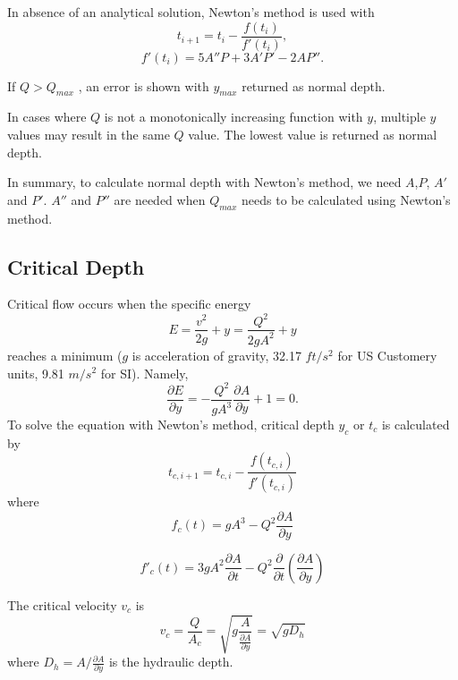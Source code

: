 \noindent In absence of an analytical solution, Newton's method is used with
\begin{equation}  
t _{i+1} = t _i - \frac{f(t _i)}{f'(t_i)},
\end{equation}
\begin{equation}  
f'(t_i) = 5A''P  + 3A'P' - 2AP''.
\end{equation}

\noindent If $Q > Q_{max}$ , an error is shown with $y_{max}$ returned as normal depth.  

\noindent In cases where $Q$ is not a monotonically increasing function with $y$, multiple $y$ values may result in the same $Q$ value. The lowest value is returned as normal depth. 

\noindent In summary, to calculate normal depth with Newton's method, we need $A$,$P$, $A'$ and $ P'$. $A''$ and $P''$ are needed when $Q_{max}$ needs to be calculated using Newton's method.

\subsection{Critical Depth}
Critical flow occurs when the specific energy
\begin{equation}
E = \frac{v^2}{2g} + y =\frac{Q^2}{2gA^2} + y 
\end{equation}
reaches a minimum ($g$ is acceleration of gravity, 32.17 $ft/s^2$ for US Customery units, 9.81 $m/s^2$ for SI). Namely,
\begin{equation}
\frac{\partial E}{\partial y} =  -\frac{Q^2}{gA^3}\frac{\partial A}{\partial y} + 1 = 0.
\end{equation}
To solve the equation with Newton's method, critical depth $y_c$ or $t_c$ is calculated by
\begin{equation}  
t_{c,i+1} = t_{c,i} -\frac{f(t_{c,i})}{f'(t_{c,i})}
\end{equation}
where
\begin{equation}  
f_c(t)= gA^3 - Q^2\frac{\partial A}{\partial y} 
\label{Eq:C}
\end{equation}

\begin{equation}  
f'_c(t)= 3gA^2\frac{\partial A}{\partial t} - Q^2\frac{\partial}{\partial t}\left(\frac{\partial A}{\partial y}\right) 
\end{equation}

\noindent The critical velocity $v_c$ is 
\begin{equation}
v_c = \frac{Q}{A_c} = \sqrt{g \frac{A}{\frac{\partial A}{\partial y}}} = \sqrt{gD_h}
\end{equation}
where $D_h = A/\frac{\partial A}{\partial y}$ is the hydraulic depth.

